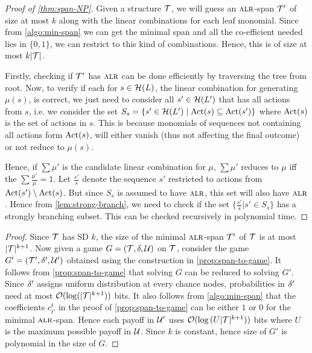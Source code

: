 \begin{proof}[Proof of \cref{thm:span-NP}]
Given a structure $\mathcal{T}$, we will guess an $\textsc{alr}$-span $\mathcal{T}'$ of size at most $k$ along with the linear combinations for each leaf monomial. Since from \cref{algo:min-span} we can get the minimal span and all the co-efficient needed lies in $\{0,1\}$, we can restrict to this kind of combinations. Hence, this is of size at most $k|\mathcal{T}|$.  

Firstly, checking if $\mathcal{T}'$ has $\textsc{alr}$ can be done efficiently by traversing the tree from root.
Now, to verify if each for $s \in \mathcal{H}(L)$, the linear combination for generating $\mu(s)$, is correct, we just need to consider all $s' \in \mathcal{H}(L')$ that has all actions from $s$,
i.e. we consider the set $S_s = \{ s' \in \mathcal{H}(L') \mid \operatorname{Act}(s) \subseteq \operatorname{Act}(s') \}$ where $\operatorname{Act}(s)$ is the set of actions in $s$. This is because monomials of sequences not containing all actions form $\operatorname{Act}(s)$, will either vanish (thus not affecting the final outcome) or not reduce to $\mu(s)$.

 Hence, if $\sum \mu'$ is the candidate linear combination for $\mu$,  $\sum \mu'$ reduces to $\mu$ iff the $\sum \frac{\mu'}{\mu} = 1$. Let $\frac{s'}{s}$ denote the sequence $s'$ restricted to actions from $\operatorname{Act}(s')\setminus \operatorname{Act}(s)$. But since $S_s$ is assumed to have $\textsc{alr}$, this set will also have $\textsc{alr}$. Hence from \cref{lem:strong-branch}, we need to check if the set $\{\frac{s'}{s} | s' \in S_s\}$ has a strongly branching subset. This can be checked recursively in polynomial time.  
\end{proof}




\efficSolvClass*

\begin{proof}
Since $\mathcal{T}$ has SD $k$, the size of the minimal $\textsc{alr}$-span $\mathcal{T}'$ of $\mathcal{T}$ is at most $|\mathcal{T}|^{k+1}$. Now given a game $G = (\mathcal{T}, \delta, \mathcal{U})$ on $\mathcal{T}$, consider the game $G' = (\mathcal{T}', \delta', \mathcal{U}')$ obtained using the construction in \cref{prop:span-to-game}. It follows from \cref{prop:span-to-game} that solving $G$ can be reduced to solving $G'$. Since $\delta'$ assigns uniform distribution at every chance nodes, probabilities in $\delta'$ need at most $\mathcal{O}(\log(|\mathcal{T}|^{k+1}))$ bits. It also follows from \cref{algo:min-span} that the coefficients $c^t_{t'}$ in the proof of \cref{prop:span-to-game} can be either $1$ or $0$ for the minimal $\textsc{alr}$-span. Hence each payoff in $\mathcal{U}'$ uses $\mathcal{O}(\log{(U|\mathcal{T}|^{k+1})})$ bits where $U$ is the maximum possible payoff in $\mathcal{U}$.
Since $k$ is constant, hence size of $G'$ is polynomial in the size of $G$. 
\end{proof}


